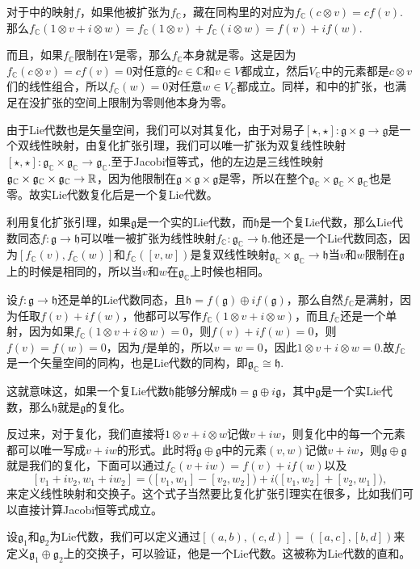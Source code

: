 \documentclass[10pt]{article}
\newcommand{\cc}{\mathbb{C}}
\newcommand{\lag}{{\mathfrak{g}}}
\begin{document}
对于中的映射$f$，如果他被扩张为$f_\cc$，藏在同构里的对应为$f_\cc(c\otimes v)=cf(v)$.那么$f_\cc(1\otimes v+i\otimes w)=f_\cc(1\otimes v)+f_\cc(i\otimes w)=f(v)+if(w)$.

而且，如果$f_\cc$限制在$V$是零，那么$f_\cc$本身就是零。这是因为$f_\cc(c\otimes v)=cf(v)=0$对任意的$c\in \cc$和$v\in V$都成立，然后$V_\cc$中的元素都是$c\otimes v$们的线性组合，所以$f_\cc(w)=0$对任意$w\in V_\cc$都成立。同样，和中的扩张，也满足在没扩张的空间上限制为零则他本身为零。

\para 由于Lie代数也是矢量空间，我们可以对其复化，由于对易子$[\star,\star]:\lag\times \lag\to \lag$是一个双线性映射，由复化扩张引理，我们可以唯一扩张为双复线性映射$[\star,\star]:\lag_\cc\times \lag_\cc\to \lag_\cc$.至于Jacobi恒等式，他的左边是三线性映射$\lag_\cc\times \lag_\cc\times \lag_\cc\to\rr$，因为他限制在$\lag\times \lag\times \lag$是零，所以在整个$\lag_\cc\times \lag_\cc\times \lag_\cc$也是零。故实Lie代数复化后是一个复Lie代数。

\para 利用复化扩张引理，如果$\lag$是一个实的Lie代数，而$\mathfrak{h}$是一个复Lie代数，那么Lie代数同态$f:\lag\to \mathfrak{h}$可以唯一被扩张为线性映射$f_\cc:\lag_\cc\to \mathfrak{h}$.他还是一个Lie代数同态，因为$[f_\cc(v),f_\cc(w)]$和$f_\cc([v,w])$是复双线性映射$\lag_\cc\times \lag_\cc\to\mathfrak{h}$当$v$和$w$限制在$\lag$上的时候是相同的，所以当$v$和$w$在$\lag_\cc$上时候也相同。

设$f:\lag\to\mathfrak{h}$还是单的Lie代数同态，且$\mathfrak{h}=f(\lag)\oplus if(\lag)$，那么自然$f_\cc$是满射，因为任取$f(v)+if(w)$，他都可以写作$f_\cc(1\otimes v+i\otimes w)$，而且$f_\cc$还是一个单射，因为如果$f_\cc(1\otimes v+i\otimes w)=0$，则$f(v)+if(w)=0$，则$f(v)=f(w)=0$，因为$f$是单的，所以$v=w=0$，因此$1\otimes v+i\otimes w=0$.故$f_\cc$是一个矢量空间的同构，也是Lie代数的同构，即$\lag_\cc\cong \mathfrak{h}$. 

这就意味这，如果一个复Lie代数$\mathfrak{h}$能够分解成$\mathfrak{h}=\lag\oplus i\lag$，其中$\lag$是一个实Lie代数，那么$\mathfrak{h}$就是$\lag$的复化。

反过来，对于复化，我们直接将$1\otimes v+i\otimes w$记做$v+iw$，则复化中的每一个元素都可以唯一写成$v+iw$的形式。此时将$\lag\oplus \lag$中的元素$(v,w)$记做$v+iw$，则$\lag\oplus \lag$就是我们的复化，下面可以通过$f_\cc(v+iw)=f(v)+if(w)$以及
\[
	[v_1+iv_2,w_1+iw_2]=\bigl([v_1,w_1]-[v_2,w_2]\bigr)+i\bigl([v_1,w_2]+[v_2,w_1]\bigr),
\]
来定义线性映射和交换子。这个式子当然要比复化扩张引理实在很多，比如我们可以直接计算Jacobi恒等式成立。

\para 设$\lag_1$和$\lag_2$为Lie代数，我们可以定义通过$[(a,b),(c,d)]=\left([a,c],[b,d]\right)$来定义$\lag_1\oplus \lag_2$上的交换子，可以验证，他是一个Lie代数。这被称为Lie代数的直和。
\end{document}
